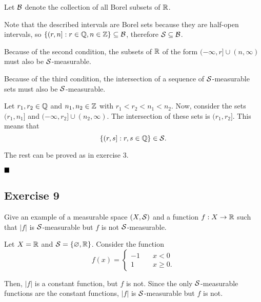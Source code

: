 Let $\mathcal{B}$ denote the collection of all Borel subsets of $\mathbb{R}$.

Note that the described intervals are Borel sets because they are half-open intervals, so $\{(r,n]:r\in\mathbb{Q},n\in\mathbb{Z}\}\subseteq\mathcal{B}$, therefore $\mathcal{S}\subseteq\mathcal{B}$.

Because of the second condition, the subsets of $\mathbb{R}$ of the form $(-\infty, r]\cup(n, \infty)$ must also be $\mathcal{S}$-measurable.

Because of the third condition, the intersection of a sequence of $\mathcal{S}$-measurable sets must also be $\mathcal{S}$-measurable.

Let $r_1, r_2\in\mathbb{Q}$ and $n_1, n_2\in\mathbb{Z}$ with $r_1 < r_2 < n_1 < n_2$. Now, consider the sets $(r_1, n_1]$ and $(-\infty, r_2]\cup(n_2, \infty)$. The intersection of these sets is $(r_1, r_2]$. This means that \[\{(r,s]:r,s\in\mathbb{Q}\}\in\mathcal{S}.\]

The rest can be proved as in exercise 3.

$\qed$

\subsection{Exercise 9}

\begin{formulationBox}
	Give an example of a measurable space $(X, \mathcal{S})$ and a function $f:X\rightarrow\mathbb{R}$ such that $|f|$ is $\mathcal{S}$-measurable but $f$ is not $\mathcal{S}$-measurable.
\end{formulationBox}

Let $X=\mathbb{R}$ and $\mathcal{S} = \{\varnothing, \mathbb{R}\}$. Consider the function
\[
	f(x) = \begin{cases}
		-1 &\quad x<0\\
		1 &\quad x\geq0.
	\end{cases}
\]

Then, $|f|$ is a constant function, but $f$ is not. Since the only $\mathcal{S}$-measurable functions are the constant functions, $|f|$ is $\mathcal{S}$-measurable but $f$ is not.
